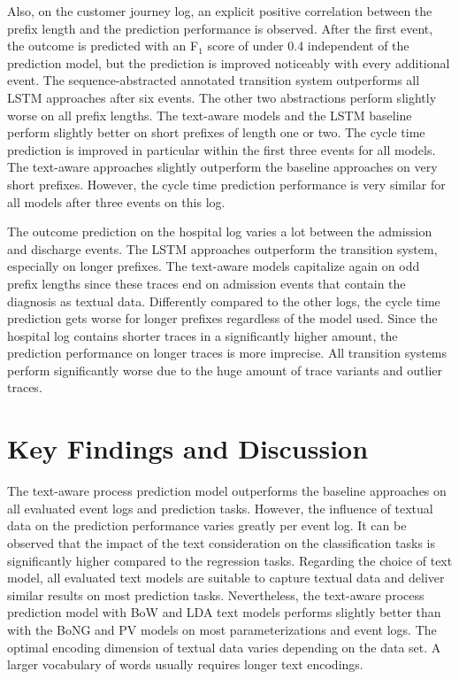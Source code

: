 Also, on the customer journey log, an explicit positive correlation between the prefix length and the prediction performance is observed.
After the first event, the outcome is predicted with an F$_1$ score of under 0.4 independent of the prediction model, but the prediction is improved noticeably with every additional event.
The sequence-abstracted annotated transition system outperforms all LSTM approaches after six events.
The other two abstractions perform slightly worse on all prefix lengths.
The text-aware models and the LSTM baseline perform slightly better on short prefixes of length one or two.
The cycle time prediction is improved in particular within the first three events for all models.
The text-aware approaches slightly outperform the baseline approaches on very short prefixes.
However, the cycle time prediction performance is very similar for all models after three events on this log.

The outcome prediction on the hospital log varies a lot between the admission and discharge events.
The LSTM approaches outperform the transition system, especially on longer prefixes.
The text-aware models capitalize again on odd prefix lengths since these traces end on admission events that contain the diagnosis as textual data.
Differently compared to the other logs, the cycle time prediction gets worse for longer prefixes regardless of the model used.
Since the hospital log contains shorter traces in a significantly higher amount, the prediction performance on longer traces is more imprecise.
All transition systems perform significantly worse due to the huge amount of trace variants and outlier traces.

\section{Key Findings and Discussion}

The text-aware process prediction model outperforms the baseline approaches on all evaluated event logs and prediction tasks.
However, the influence of textual data on the prediction performance varies greatly per event log.
It can be observed that the impact of the text consideration on the classification tasks is significantly higher compared to the regression tasks.
Regarding the choice of text model, all evaluated text models are suitable to capture textual data and deliver similar results on most prediction tasks.
Nevertheless, the text-aware process prediction model with BoW and LDA text models performs slightly better than with the BoNG and PV models on most parameterizations and event logs.
The optimal encoding dimension of textual data varies depending on the data set.
A larger vocabulary of words usually requires longer text encodings.

